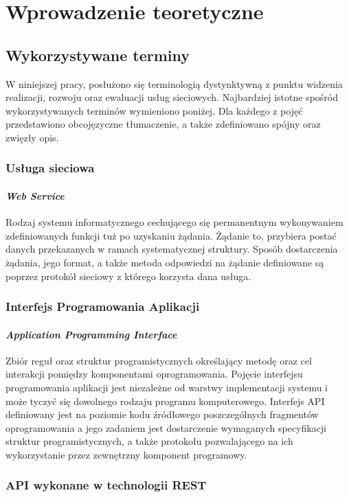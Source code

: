 \chapter{Wprowadzenie teoretyczne}
\section{Wykorzystywane terminy}
\label{sec:terminy}
W niniejszej pracy, posłużono się terminologią dystynktywną z punktu widzenia realizacji, rozwoju oraz ewaluacji usług sieciowych. Najbardziej istotne spośród wykorzystywanych terminów wymieniono poniżej. Dla każdego z pojęć przedstawiono obcojęzyczne tłumaczenie, a także zdefiniowano spójny oraz zwięzły opis.

\subsection*{Usługa sieciowa}
\subsubsection{\textit{Web Service}}
Rodzaj systemu informatycznego cechującego się permanentnym wykonywaniem zdefiniowanych funkcji tuż po uzyskaniu żądania. Żądanie to, przybiera postać danych przekazanych w ramach systematycznej struktury. Sposób dostarczenia żądania, jego format, a także metoda odpowiedzi na żądanie definiowane są poprzez protokół sieciowy z którego korzysta dana usługa.

\subsection*{Interfejs Programowania Aplikacji}
\subsubsection{\textit{Application Programming Interface}}
Zbiór reguł oraz struktur programistycznych określający metodę oraz cel interakcji pomiędzy komponentami oprogramowania. Pojęcie interfejsu programowania aplikacji jest niezależne od warstwy implementacji systemu i może tyczyć się dowolnego rodzaju programu komputerowego. Interfejs API definiowany jest na poziomie kodu źródłowego poszczególnych fragmentów oprogramowania a jego zadaniem jest dostarczenie wymaganych specyfikacji struktur programistycznych, a także protokołu pozwalającego na ich wykorzystanie przez zewnętrzny komponent programowy.  

\subsection*{API wykonane w technologii REST}
